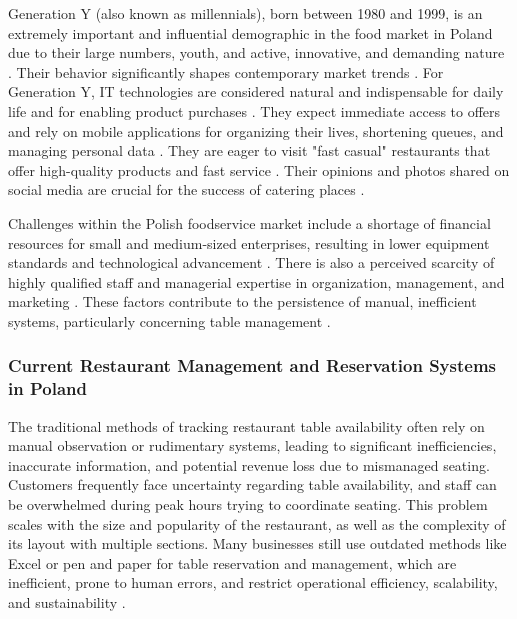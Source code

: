 \documentclass{article}
\begin{document}
Generation Y (also known as millennials), born between 1980 and 1999, is an extremely important and influential demographic in the food market in Poland due to their large numbers, youth, and active, innovative, and demanding nature \parencite{kucharska2019trends}. Their behavior significantly shapes contemporary market trends \parencite{kucharska2019trends}. For Generation Y, IT technologies are considered natural and indispensable for daily life and for enabling product purchases \parencite{kucharska2019trends}. They expect immediate access to offers and rely on mobile applications for organizing their lives, shortening queues, and managing personal data \parencite{kucharska2019trends}. They are eager to visit "fast casual" restaurants that offer high-quality products and fast service \parencite{kucharska2019trends}. Their opinions and photos shared on social media are crucial for the success of catering places \parencite{kucharska2019trends}.

Challenges within the Polish foodservice market include a shortage of financial resources for small and medium-sized enterprises, resulting in lower equipment standards and technological advancement \parencite{kowalczuk2015eating}. There is also a perceived scarcity of highly qualified staff and managerial expertise in organization, management, and marketing \parencite{kowalczuk2015eating}. These factors contribute to the persistence of manual, inefficient systems, particularly concerning table management \parencite{kowalczuk2015eating}.

\subsubsection{Current Restaurant Management and Reservation Systems in Poland}
The traditional methods of tracking restaurant table availability often rely on manual observation or rudimentary systems, leading to significant inefficiencies, inaccurate information, and potential revenue loss due to mismanaged seating. Customers frequently face uncertainty regarding table availability, and staff can be overwhelmed during peak hours trying to coordinate seating. This problem scales with the size and popularity of the restaurant, as well as the complexity of its layout with multiple sections. Many businesses still use outdated methods like Excel or pen and paper for table reservation and management, which are inefficient, prone to human errors, and restrict operational efficiency, scalability, and sustainability \parencite{skakun2024restaurant}.
\end{document}
